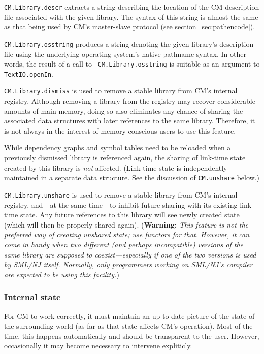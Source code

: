 \documentclass[titlepage,letterpaper]{article}
\begin{document}
{\tt CM.Library.descr} extracts a string describing the location of
the CM description file associated with the given library.  The syntax
of this string is almost the same as that being used by CM's
master-slave protocol (see section~\ref{sec:pathencode}).

{\tt CM.Library.osstring} produces a string denoting the given
library's description file using the underlying operating system's
native pathname syntax.  In other words, the result of a call to {\tt
CM.Library.osstring} is suitable as an argument to {\tt
TextIO.openIn}.

{\tt CM.Library.dismiss} is used to remove a stable library from CM's
internal registry.  Although removing a library from the registry may
recover considerable amounts of main memory, doing so also eliminates
any chance of sharing the associated data structures with later
references to the same library.  Therefore, it is not always in the
interest of memory-conscious users to use this feature.

While dependency graphs and symbol tables need to be reloaded when a
previously dismissed library is referenced again, the sharing of
link-time state created by this library is {\em not} affected.
(Link-time state is independently maintained in a separate data
structure.  See the discussion of {\tt CM.unshare} below.)

{\tt CM.Library.unshare} is used to remove a stable library from CM's
internal registry, and---at the same time---to inhibit future sharing
with its existing link-time state.  Any future references to this
library will see newly created state (which will then be properly
shared again).  ({\bf Warning:} {\it This feature is not the preferred
way of creating unshared state; use functors for that.  However, it
can come in handy when two different (and perhaps incompatible)
versions of the same library are supposed to coexist---especially if
one of the two versions is used by SML/NJ itself.  Normally, only
programmers working on SML/NJ's compiler are expected to be using this
facility.})

\subsubsection*{Internal state}

For CM to work correctly, it must maintain an up-to-date picture of
the state of the surrounding world (as far as that state affects CM's
operation).  Most of the time, this happens automatically and should be
transparent to the user.  However, occasionally it may become
necessary to intervene expliticly.
\end{document}
